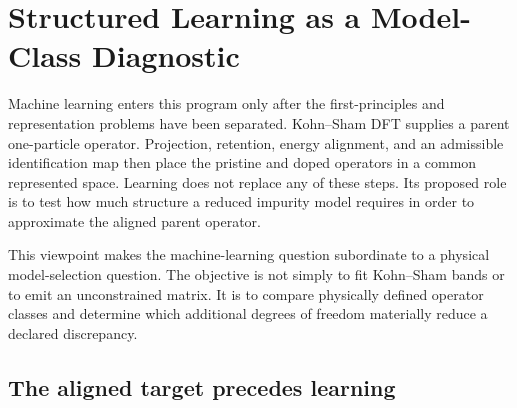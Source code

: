 \chapter{Structured Learning as a Model-Class Diagnostic}

\label{ch:structured-learning}


Machine learning enters this program only after the first-principles and
representation problems have been separated. Kohn--Sham DFT supplies a parent
one-particle operator. Projection, retention, energy alignment, and an
admissible identification map then place the pristine and doped operators in a
common represented space. Learning does not replace any of these steps. Its
proposed role is to test how much structure a reduced impurity model requires
in order to approximate the aligned parent operator.


This viewpoint makes the machine-learning question subordinate to a physical
model-selection question. The objective is not simply to fit Kohn--Sham bands
or to emit an unconstrained matrix. It is to compare physically defined
operator classes and determine which additional degrees of freedom materially
reduce a declared discrepancy.

\section{The aligned target precedes learning}


